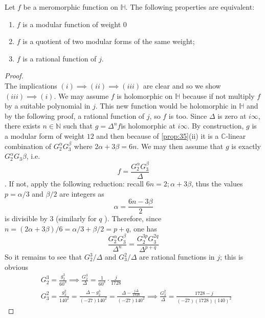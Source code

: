 \documentclass[12pt]{article}
\theoremstyle{definition}
\begin{document}
\begin{prop}
Let \(f\) be a meromorphic function on \(\mathbb{H}\). The following properties are equivalent:
\begin{enumerate}
    \item \(f\) is a modular function of weight \(0\)
    \item \(f\) is a quotient of two modular forms of the same weight;
    \item \(f\) is a rational function of \(j\). 
\end{enumerate}
\end{prop}
\begin{proof}~\\
The implications \((i)\implies (ii)\implies (iii)\) are clear and so we show \((iii)\implies (i)\).\newline
We may assume \(f\) is holomorphic on \(\mathbb{H} \) because if not multiply \(f\) by a suitable polynomial in \(j\). This new function would be holomorphic in \(\mathbb{H} \) and by the following proof, a rational function of \(j\), so \(f\) is too.\newline
Since \(\Delta \) is zero at \(i\infty \), there exists \(n\in\mathbb{N} \) such that \(g=\Delta ^nf\)is holomorphic at \(i\infty \). By construction, \(g\) is a modular form of weight \(12\) and then because of \cref{prop:35}(ii) it is a \(\mathbb{C} \)-linear combination of \(G_2^\alpha G_3^\beta \) where \(2\alpha +3\beta =6n\). We may then assume that \(g\) is exactly \(G_2^\alpha G_3\beta \), i.e.
\[
    f=\frac{G_2^\alpha G_3^\beta }{\Delta }
\]. If not, apply the following reduction: recall \(6n=2;\alpha+3\beta \), thus the values \(p=\alpha /3\) and \(\beta /2\) are integers as
\[
    \alpha =\frac{6n-3\beta }{2}
\] 
is divisible by \(3\) (similarly for \(q\) ).
Therefore, since \(n=(2\alpha +3\beta )/6=\alpha /3+\beta /2=p+q\), one has 
\[
    \frac{G_2^\alpha G_3^\beta }{\Delta ^n}=\frac{G_2^{3p}G_3^{2q}}{\Delta ^{p+q}}
\]     
So it remains to see that \(G_2^3/\Delta \) and \(G_3^2/\Delta \) are rational functions in \(j\); this is obvious 
\begin{align*}
&G_2^3=\frac{g_2^3}{60^3} \implies \frac{G_2^3}{\Delta }=\frac{1}{60^3}\cdot \frac{j}{1728}\\
&G_3^2=\frac{g_3^2}{140^2}=\frac{\Delta -g_2^3}{(-27)140^2} =\frac{\Delta -\frac{j \Delta }{1728}}{(-27)140^2} \implies \frac{G_3^2}{\Delta } = \frac{1728-j}{(-27)(1728)(140)^2}
\end{align*}
\end{proof}
\end{document}
